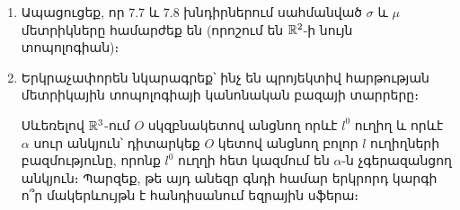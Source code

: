 \begin{enumerate}[label=\thesection.\arabic*.]
\begin{center}
\end{center}


\par \textbf{Ցուցում} բ)-ի վերաբերյալ․ Ցույց տվեք, որ սևեռված $x^0 = (x_1^0, x_2^0)$ կետի դեպ\-քում $x^0$ կենտրոնով, $r$ շառավղով $\mathcal{D}(x^0, r) = \{y \in \R^2 : \mu(x^0 , y)<r\}$ բաց շրջանը ստացվում է $O=(0, 0)$ կենտրոնով և $2r$ կողմով $\mathcal{D}(O, r) = \{y \in \R^2 : |y_1|<r,\ |y_2|<r\}$ անեզր քառակուսուց՝ նրա $O$ կենտրոնի զուգահեռ տեղափոխությունով $x^0$ կետ։

\item Ապացուցեք, որ 7.7 և 7.8 խնդիրներում սահմանված $\sigma$ և $\mu$ մետրիկները համ\-ար\-ժեք են (որոշում են $\mathbb{R}^2$-ի նույն տոպոլոգիան)։

\item Երկրաչափորեն նկարագրեք՝ ինչ են պրոյեկտիվ հարթության մետրիկային տոպոլոգիայի կանոնական բազայի տարրերը։ 

\begin{hint} Սևեռելով $\mathbb{R}^3$-ում $O$ սկզբնակետով անցնող որևէ $l^0$ ուղիղ և որևէ $\alpha$ սուր անկյուն՝ դիտարկեք $O$ կետով անցնող բոլոր $l$ ուղիղների բազմությունը, որոնք $l^0$ ուղղի հետ կազմում են $\alpha$-ն չգերազանցող անկյուն։ Պարզեք, թե այդ անեզր գնդի համար երկրորդ կարգի ո՞ր մակերևույթն է հանդիսանում եզրային սֆերա։ 
\end{hint}



\end{enumerate}
